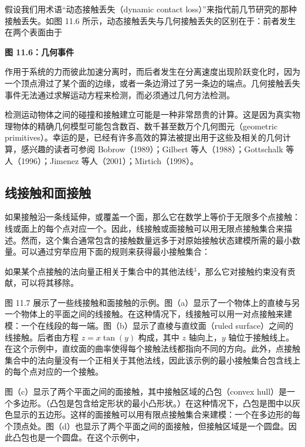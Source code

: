 \documentclass[10pt,a4paper]{book}
\theoremstyle{thmstyle} %
\theoremstyle{defstyle} %
\theoremstyle{prostyle} %
\begin{document}
假设我们用术语“动态接触丢失（dynamic contact loss）”来指代前几节研究的那种接触丢失。如图 11.6 所示，动态接触丢失与几何接触丢失的区别在于：前者发生在两个表面由于



\noindent\textbf{图 11.6：几何事件}





作用于系统的力而彼此加速分离时，而后者发生在分离速度出现阶跃变化时，因为一个顶点滑过了某个面的边缘，或者一条边滑过了另一条边的端点。几何接触丢失事件无法通过求解运动方程来检测，而必须通过几何方法检测。



检测运动物体之间的碰撞和接触建立可能是一种非常昂贵的计算。这是因为真实物理物体的精确几何模型可能包含数百、数千甚至数万个几何图元（geometric primitives）。幸运的是，已经有许多高效的算法被提出用于这些及相关的几何计算，感兴趣的读者可参阅 Bobrow（1989）；Gilbert 等人（1988）；Gottschalk 等人（1996）；Jimenez 等人（2001）；Mirtich（1998）。



\subsection{线接触和面接触}





如果接触沿一条线延伸，或覆盖一个面，那么它在数学上等价于无限多个点接触：线或面上的每个点对应一个。因此，线接触或面接触可以用无限点接触集合来描述。然而，这个集合通常包含的接触数量远多于对原始接触状态建模所需的最小数量。可以通过穷举应用下面的规则来获得最小接触集合：



如果某个点接触的法向量正相关于集合中的其他法线$^{3}$，那么它对接触约束没有贡献，可以将其移除。



图 11.7 展示了一些线接触和面接触的示例。图（a）显示了一个物体上的直棱与另一个物体上的平面之间的线接触。在这种情况下，线接触可以用一对点接触来建模：一个在线段的每一端。图（b）显示了直棱与直纹面（ruled surface）之间的线接触。后者由方程 $z = x \tan(y)$ 构成，其中 $z$ 轴向上，$y$ 轴位于接触线上。在这个示例中，直纹面的曲率使得每个接触法线都指向不同的方向。此外，点接触集合中的法向量没有一个正相关于其他法线，因此该示例的最小接触集合包含线上的每个点对应的一个接触。



图（c）显示了两个平面之间的面接触，其中接触区域的凸包（convex hull）是一个多边形。（凸包是包含给定形状的最小凸形状。）在这种情况下，凸包是图中以灰色显示的五边形。这样的面接触可以用有限点接触集合来建模：一个在多边形的每个顶点处。图（d）也显示了两个平面之间的面接触，但接触区域是一个圆盘。因此凸包也是一个圆盘。在这个示例中，
\end{document}
